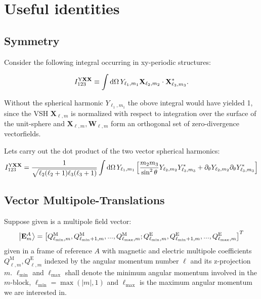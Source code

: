 \section{Useful identities}
\subsection{Symmetry}
Consider the following integral occurring in xy-periodic structures:

\begin{equation}
I^{\mathrm{Y\mathbf{X}\mathbf{X}}}_{123} \equiv \int \mathrm{d} \Omega \, Y_{\ell_1, m_1} \mathbf{X}_{\ell_2, m_2}\cdot \mathbf{X}^*_{\ell_3,m_3}.
\label{eqn:YXX_integral}
\end{equation}

Without the spherical harmonic $Y_{\ell_1,m_1}$ the obove integral would have yielded
1, since the VSH $\mathbf{X}_{\ell, m}$ is normalized with respect to integration over the surface of the unit-sphere and $\mathbf{X}_{\ell,m},\mathbf{W}_{\ell,m}$ form an orthogonal set of zero-divergence vectorfields. 

Lets carry out the dot product of the two vector spherical harmonics:
\begin{equation}
I^{\mathrm{Y\mathbf{X}\mathbf{X}}}_{123} =\frac{1}{\sqrt{\ell_2(\ell_2+1)\ell_3(\ell_3+1)}}\int \mathrm{d} \Omega\, 
Y_{\ell_1,m_1}\left[
\frac{m_2 m_3}{\sin^2\theta} Y_{\ell_2,m_2} Y^*_{\ell_3, m_3}
+\partial_\theta Y_{\ell_2,m_2}\partial_\theta Y^*_{\ell_3,m_3}
\right]
\label{eqn:YXX_integral_split}
\end{equation}

\subsection{Vector Multipole-Translations}
Suppose given is a multipole field vector:
\begin{equation}
\ket{\mathbf{E}_m^A} = \left[
Q^\text{M}_{\ell_\text{min},m}, Q^\text{M}_{\ell_\text{min}+1,m},...,
Q^\text{M}_{\ell_\text{max},m};
Q^\text{E}_{\ell_\text{min},m}, Q^\text{E}_{\ell_\text{min}+1,m},...,
Q^\text{E}_{\ell_\text{max},m}
\right]^T
\end{equation}
given in a frame of reference $A$ with magnetic and electric multipole coefficients $Q^\text{M}_{\ell,m}, Q^\text{E}_{\ell,m}$ indexed by the angular momentum number $\ell$ and its z-projection $m$. $\ell_\text{min}$ and $\ell_\text{max}$ shall denote the minimum angular momentum involved in the $m$-block, $\ell_\text{min}=\max(|m|,1)$ and $\ell_\text{max}$ is the maximum angular momentum we are interested in.

